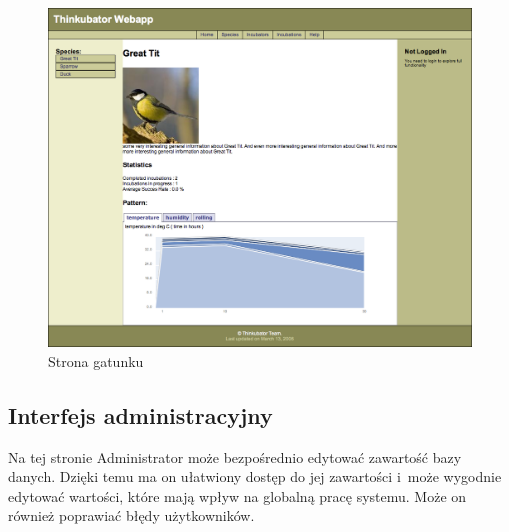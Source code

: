 \begin{figure}[p] 
\centering\includegraphics[width=.8\textwidth]{figures/CNgatunek}
\caption{Strona gatunku}\label{rys:CNgatunek}
\end{figure}

\subsection{Interfejs administracyjny}
Na tej stronie Administrator może bezpośrednio edytować zawartość bazy danych.
Dzięki temu ma on ułatwiony dostęp do jej zawartości i~może wygodnie edytować
wartości, które mają wpływ na globalną pracę systemu. Może on również poprawiać
błędy użytkowników.

